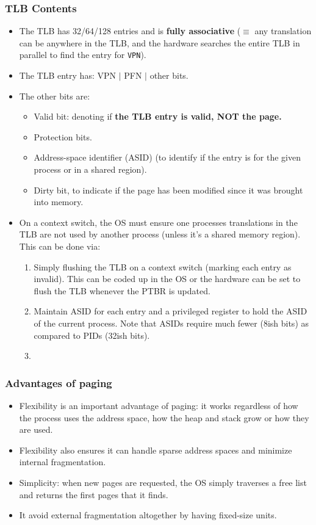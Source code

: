 \documentclass[10pt]{report}
\begin{document}
\subsubsection{TLB Contents}
\begin{itemize}
    \item The TLB has 32/64/128 entries and is \textbf{fully associative} ($\equiv$ any translation can be anywhere in the TLB, and the hardware searches the entire TLB in parallel to find the entry for \texttt{VPN}).
    \item The TLB entry has: VPN $|$ PFN $|$ other bits.
    \item The other bits are:
        \begin{itemize}
            \item Valid bit: denoting if \textbf{the TLB entry is valid, NOT the page.}
            \item Protection bits.
            \item Address-space identifier (ASID) (to identify if the entry is for the given process or in a shared region).
            \item Dirty bit, to indicate if the page has been modified since it was brought into memory.
        \end{itemize}
    \item On a context switch, the OS must ensure one processes translations in the TLB are not used by another process (unless it's a shared memory region). This can be done via:
    \begin{enumerate}
    \item Simply flushing the TLB on a context switch (marking each entry as invalid). This can be coded up in the OS or the hardware
    can be set to flush the TLB whenever the PTBR is updated.
    \item Maintain ASID for each entry and a privileged register to hold the ASID of the current process. Note that ASIDs require much fewer (8ish bits) as compared to PIDs (32ish bits).
    \item 
    \end{enumerate}
\end{itemize}
\subsubsection{Advantages of paging}
\begin{itemize}
    \item Flexibility is an important advantage of paging: it works 
    regardless of how the process uses the address space, how the heap and stack grow or how they are used.
    \item Flexibility also ensures it can handle sparse address spaces and minimize internal fragmentation.
    \item Simplicity: when new pages are requested, the OS simply
    traverses a free list and returns the first pages that it finds.
    \item It avoid external fragmentation altogether by having fixed-size units.
\end{itemize}
\end{document}
